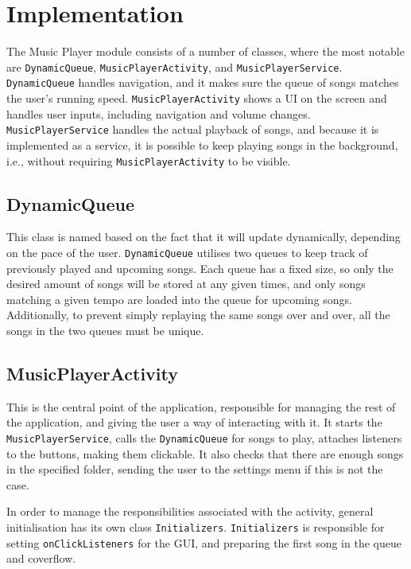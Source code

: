 \section{Implementation}
The Music Player module consists of a number of classes, where the most notable are \texttt{DynamicQueue}, \texttt{MusicPlayerActivity}, and \texttt{MusicPlayerService}. \texttt{DynamicQueue} handles navigation, and it makes sure the queue of songs matches the user's running speed. \texttt{MusicPlayerActivity} shows a UI on the screen and handles user inputs, including navigation and volume changes. \texttt{MusicPlayerService} handles the actual playback of songs, and because it is implemented as a service, it is possible to keep playing songs in the background, i.e., without requiring \texttt{MusicPlayerActivity} to be visible.

\subsection{DynamicQueue}
\label{sec:dynamicQueue}
This class is named based on the fact that it will update dynamically, depending on the pace of the user. \texttt{DynamicQueue} utilises two queues to keep track of previously played and upcoming songs.
Each queue has a fixed size, so only the desired amount of songs will be stored at any given times, and only songs matching a given tempo are loaded into the queue for upcoming songs. 
Additionally, to prevent simply replaying the same songs over and over, all the songs in the two queues must be unique.

\subsection{MusicPlayerActivity}
This is the central point of the application, responsible for managing the rest of the application, and giving the user a way of interacting with it. It starts the \texttt{MusicPlayerService}, calls the \texttt{DynamicQueue} for songs to play, attaches listeners to the buttons, making them clickable. It also checks that there are enough songs in the specified folder, sending the user to the settings menu if this is not the case.

In order to manage the responsibilities associated with the activity, general initialisation has its own class \texttt{Initializers}. \texttt{Initializers} is responsible for setting \texttt{onClickListeners} for the GUI, and preparing the first song in the queue and coverflow. 

